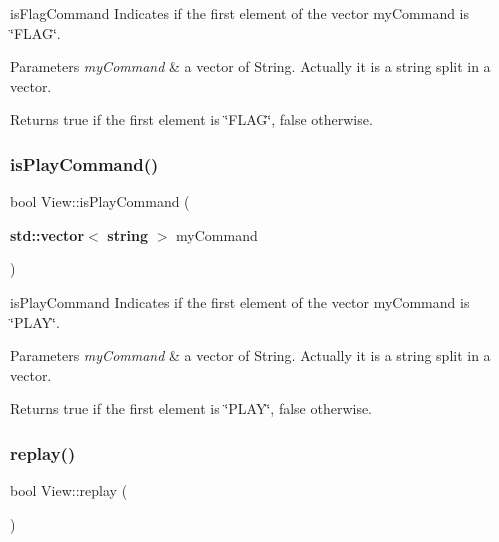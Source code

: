 is\+Flag\+Command Indicates if the first element of the vector my\+Command is \char`\"{}\+F\+L\+A\+G\char`\"{}. 


\begin{DoxyParams}{Parameters}
{\em my\+Command} & a vector of String. Actually it is a string split in a vector. \\
\hline
\end{DoxyParams}
\begin{DoxyReturn}{Returns}
true if the first element is \char`\"{}\+F\+L\+A\+G\char`\"{}, false otherwise. 
\end{DoxyReturn}
\mbox{\label{class_view_aad0487a7cc70e7e03ce8d0dc39c570c4}} 
\subsubsection{\texorpdfstring{is\+Play\+Command()}{isPlayCommand()}}
{\footnotesize\ttfamily bool View\+::is\+Play\+Command (\begin{DoxyParamCaption}\item[{\textbf{ std\+::vector}$<$ \textbf{ string} $>$}]{my\+Command }\end{DoxyParamCaption})}



is\+Play\+Command Indicates if the first element of the vector my\+Command is \char`\"{}\+P\+L\+A\+Y\char`\"{}. 


\begin{DoxyParams}{Parameters}
{\em my\+Command} & a vector of String. Actually it is a string split in a vector. \\
\hline
\end{DoxyParams}
\begin{DoxyReturn}{Returns}
true if the first element is \char`\"{}\+P\+L\+A\+Y\char`\"{}, false otherwise. 
\end{DoxyReturn}
\mbox{\label{class_view_afb916cc64d0666923a67065771907fe3}} 
\subsubsection{\texorpdfstring{replay()}{replay()}}
{\footnotesize\ttfamily bool View\+::replay (\begin{DoxyParamCaption}{ }\end{DoxyParamCaption})}




